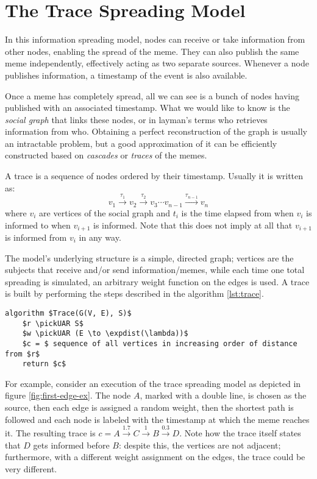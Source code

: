 \section{The Trace Spreading Model}

In this information spreading model, nodes can receive or take information from other nodes, enabling the spread of the meme. They can also publish the same meme independently, effectively acting as two separate sources. Whenever a node publishes information, a timestamp of the event is also available.

Once a meme has completely spread, all we can see is a bunch of nodes having published with an associated timestamp. What we would like to know is the \emph{social graph} that links these nodes, or in layman's terms who retrieves information from who. Obtaining a perfect reconstruction of the graph is usually an intractable problem, but a good approximation of it can be efficiently constructed based on \textit{cascades} or \textit{traces} of the memes.

\begin{defn}[Trace]
    A trace is a sequence of nodes ordered by their timestamp. Usually it is written as:
    \[
        v_1 \stackrel{\tau_1}{\longrightarrow} v_2 \stackrel{\tau_2}{\longrightarrow} v_3 \cdots v_{n - 1} \stackrel{\tau_{n - 1}}{\longrightarrow} v_n
    \]
    where $v_i$ are vertices of the social graph and $t_i$ is the time elapsed from when $v_i$ is informed to when $v_{i + 1}$ is informed. Note that this does not imply at all that $v_{i + 1}$ is informed from $v_i$ in any way.
\end{defn}

The model's underlying structure is a simple, directed graph; vertices are the subjects that receive and/or send information/memes, while  each time one total spreading is simulated, an arbitrary weight function on the edges is used. A trace is built by performing the steps described in the algorithm \ref{lst:trace}.

\begin{lstlisting}[caption = {Algorithm for building a trace}, label = {lst:trace}]
algorithm $Trace(G(V, E), S)$
    $r \pickUAR S$
    $w \pickUAR (E \to \expdist(\lambda))$
    $c = $ sequence of all vertices in increasing order of distance from $r$
    return $c$
\end{lstlisting}

For example, consider an execution of the trace spreading model as depicted in figure \ref{fig:first-edge-ex}. The node $A$, marked with a double line, is chosen as the source, then each edge is assigned a random weight, then the shortest path is followed and each node is labeled with the timestamp at which the meme reaches it. The resulting trace is $c = A \stackrel{1.7}{\longrightarrow} C \stackrel{1}{\longrightarrow} B \stackrel{0.3}{\longrightarrow} D$. Note how the trace itself states that $D$ gets informed before $B$: despite this, the vertices are not adjacent; furthermore, with a different weight assignment on the edges, the trace could be very different.

